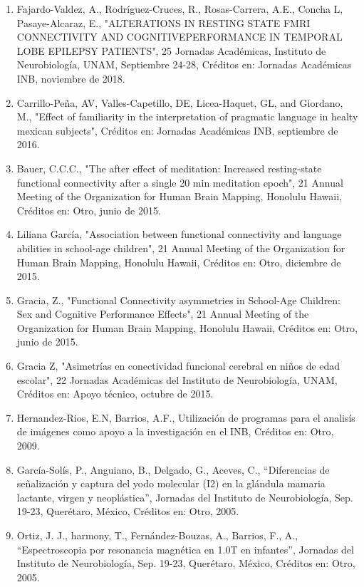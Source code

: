 \documentclass[12pt]{article}
\begin{document}
\begin{enumerate}
\item Fajardo-Valdez, A., Rodríguez-Cruces, R., Rosas-Carrera, A.E., Concha L, Pasaye-Alcaraz, E., "ALTERATIONS IN RESTING STATE FMRI 
CONNECTIVITY AND COGNITIVEPERFORMANCE IN TEMPORAL LOBE EPILEPSY PATIENTS", 25 Jornadas Académicas, Instituto de Neurobiología, UNAM, 
Septiembre 24-28, Créditos en: Jornadas Académicas INB, noviembre de 2018.

\item Carrillo-Peña, AV, Valles-Capetillo, DE, Licea-Haquet, GL, and Giordano, M., "Effect of familiarity in the interpretation of 
pragmatic language in healty mexican subjects", Créditos en: Jornadas Académicas INB, septiembre de 2016.

\item Bauer, C.C.C., "The after effect of meditation: Increased resting-state functional connectivity after a single 20 min meditation 
epoch", 21 Annual Meeting of the Organization for Human Brain Mapping, Honolulu Hawaii, Créditos en: Otro, junio de 2015.

\item Liliana García, "Association between functional connectivity and language abilities in school-age children", 21 Annual Meeting of 
the Organization for Human Brain Mapping, Honolulu Hawaii, Créditos en: Otro, diciembre de 2015.

\item Gracia, Z., "Functional Connectivity asymmetries in School-Age Children: Sex and Cognitive Performance Effects", 21 Annual 
Meeting 
of the Organization for Human Brain Mapping, Honolulu Hawaii, Créditos en: Otro, junio de 2015.

\item Gracia Z, "Asimetrías en conectividad funcional cerebral en niños de edad escolar", 22 Jornadas Académicas del Instituto de 
Neurobiología, UNAM, Créditos en: Apoyo técnico, octubre de 2015.

\item Hernandez-Rios, E.N, Barrios, A.F., Utilización de programas para el analisís de imágenes como apoyo a la investigación en el 
INB, 
Créditos en: Otro, 2009.

\item García-Solís, P., Anguiano, B., Delgado, G., Aceves, C., “Diferencias de señalización y captura del yodo molecular (I2) en la 
glándula mamaria lactante, virgen y neoplástica”, Jornadas del Instituto de Neurobiología, Sep. 19-23, Querétaro, México, Créditos en: 
Otro, 2005.

\item Ortiz, J. J., harmony, T., Fernández-Bouzas, A., Barrios, F., A., “Espectroscopia por resonancia magnética en 1.0T en infantes”, 
Jornadas del Instituto de Neurobiología, Sep. 19-23, Querétaro, México, Créditos en: Otro, 2005.


\end{enumerate}
\end{document}
